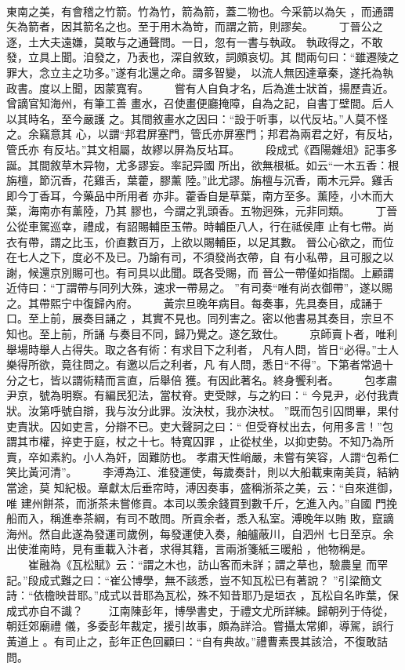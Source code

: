 \documentclass{ctexart}
\begin{document}
\paragraph{}
東南之美，有會稽之竹箭。竹為竹，箭為箭，蓋二物也。今采箭以為矢 ，而通謂矢為箭者，因其箭名之也。至于用木為笴，而謂之箭，則謬矣。 　　丁晉公之逐，土大夫遠嫌，莫敢与之通聲問。一日，忽有一書与執政。 執政得之，不敢發，立具上聞。洎發之，乃表也，深自敘致，詞頗哀切。其 間兩句曰：``雖遷陵之罪大，念立主之功多。''遂有北還之命。謂多智變， 以流人無因達章秦，遂托為執政書。度以上聞，因蒙寬宥。 　　嘗有人自負才名，后為進士狀首，揚歷貴近。曾謫官知海州，有筆工善 畫水，召使畫便廳掩障，自為之記，自書丁壁間。后人以其時名，至今嚴護 之。其間敘畫水之因曰：``設于听事，以代反坫。''人莫不怪之。余竊意其 心，以謂``邦君屏塞門，管氏亦屏塞門；邦君為兩君之好，有反坫，管氏亦 有反坫。''其文相屬，故繆以屏為反坫耳。 　　段成式《酉陽雜俎》記事多誕。其間敘草木异物，尤多謬妄。率記异國 所出，欲無根柢。如云``一木五香：根旃檀，節沉香，花雞舌，葉藿，膠薰 陸。''此尤謬。旃檀与沉香，兩木元异。雞舌即今丁香耳，今藥品中所用者 亦非。藿香自是草葉，南方至多。薰陸，小木而大葉，海南亦有薰陸，乃其 膠也，今謂之乳頭香。五物迥殊，元非同類。 　　丁晉公從車駕巡幸，禮成，有詔賜輔臣玉帶。時輔臣八人，行在祗侯庫 止有七帶。尚衣有帶，謂之比玉，价直數百万，上欲以賜輔臣，以足其數。 晉公心欲之，而位在七人之下，度必不及已。乃諭有司，不須發尚衣帶，自 有小私帶，且可服之以謝，候還京別賜可也。有司具以此聞。既各受賜，而 晉公一帶僅如指闊。上顧謂近侍曰：``丁謂帶与同列大殊，速求一帶易之。 ''有司奏``唯有尚衣御帶''，遂以賜之。其帶熙宁中復歸內府。 　　黃宗旦晚年病目。每奏事，先具奏目，成誦于口。至上前，展奏目誦之 ，其實不見也。同列害之。密以他書易其奏目，宗旦不知也。至上前，所誦 与奏目不同，歸乃覺之。遂乞致仕。 　　京師賣卜者，唯利舉場時舉人占得失。取之各有術：有求目下之利者， 凡有人問，皆日``必得。''士人樂得所欲，竟往問之。有邀以后之利者，凡 有人問，悉日``不得''。下第者常過十分之七，皆以謂術精而言直，后舉倍 獲。有因此著名。終身饗利者。 　　包孝肅尹京，號為明察。有編民犯法，當杖脊。吏受賕，与之約曰：`` 今見尹，必付我責狀。汝第呼號自辯，我与汝分此罪。汝決杖，我亦決杖。 ''既而包引囚問畢，果付吏責狀。囚如吏言，分辯不已。吏大聲訶之曰：`` 但受脊杖出去，何用多言！''包謂其市權，捽吏于庭，杖之十七。特寬囚罪 ，止從杖坐，以抑吏勢。不知乃為所賣，卒如素約。小人為奸，固難防也。 孝肅天性峭嚴，未嘗有笑容，人謂``包希仁笑比黃河清''。 　　李溥為江、淮發運使，每歲奏計，則以大船載東南美貨，結納當途，莫 知紀极。章獻太后垂帘時，溥因奏事，盛稱浙茶之美，云：``自來進御，唯 建州餅茶，而浙茶未嘗修貢。本司以羡余錢買到數千斤，乞進入內。''自國 門挽船而入，稱進奉茶綱，有司不敢問。所貢余者，悉入私室。溥晚年以賄 敗，竄謫海州。然自此遂為發運司歲例，每發運使入奏，舳艫蔽川，自泗州 七日至京。余出使淮南時，見有重載入汴者，求得其籍，言兩浙箋紙三暖船 ，他物稱是。 　　崔融為《瓦松賦》云：``謂之木也，訪山客而未詳；謂之草也，驗農皇 而罕記。''段成式難之曰：``崔公博學，無不該悉，豈不知瓦松已有著說？ ''引梁簡文詩：``依檐映昔耶。''成式以昔耶為瓦松，殊不知昔耶乃是垣衣 ，瓦松自名昨葉，保成式亦自不識？ 　　江南陳彭年，博學書史，于禮文尤所詳練。歸朝列于侍從，朝廷郊廟禮 儀，多委彭年裁定，援引故事，頗為詳洽。嘗攝太常卿，導駕，誤行黃道上 。有司止之，彭年正色回顧曰：``自有典故。''禮曹素畏其該洽，不復敢詰 問。 
\end{document}
